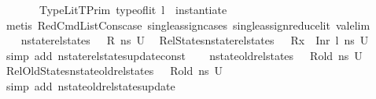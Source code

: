 \begin{isabellebody}
\ \ \ \ \ \ \ TypeLit{\isacharcolon}{\kern0pt}{\isachardoublequoteopen}TPrim\ {\isacharparenleft}{\kern0pt}type{\isacharunderscore}{\kern0pt}of{\isacharunderscore}{\kern0pt}lit\ l{\isacharparenright}{\kern0pt}\ {\isacharequal}{\kern0pt}\ instantiate\ {\isasymOmega}\ {\isasymtau}{\isachardoublequoteclose}\isanewline
\ \ \ \ \isamarkupfalse%
\ {\isacharparenleft}{\kern0pt}metis\ RedCmdListCons{\isacharunderscore}{\kern0pt}case\ single{\isacharunderscore}{\kern0pt}assign{\isacharunderscore}{\kern0pt}cases\ single{\isacharunderscore}{\kern0pt}assign{\isacharunderscore}{\kern0pt}reduce{\isacharunderscore}{\kern0pt}lit\ val{\isacharunderscore}{\kern0pt}elim{\isacharparenright}{\kern0pt}\isanewline
\ \ \ \ \isanewline
\ \ \isamarkupfalse%
\ {\isacartoucheopen}nstate{\isacharunderscore}{\kern0pt}rel{\isacharunderscore}{\kern0pt}states\ {\isasymLambda}\ {\isasymLambda}{\isacharprime}{\kern0pt}\ R\ ns\ U{}{\isacartoucheclose}\ \isamarkupfalse%
\ RelStates{\isacharcolon}{\kern0pt}{\isachardoublequoteopen}nstate{\isacharunderscore}{\kern0pt}rel{\isacharunderscore}{\kern0pt}states\ {\isasymLambda}\ {\isasymLambda}{\isacharprime}{\kern0pt}\ {\isacharparenleft}{\kern0pt}R{\isacharparenleft}{\kern0pt}x{}\ {\isasymmapsto}\ Inr\ l{\isacharparenright}{\kern0pt}{\isacharparenright}{\kern0pt}\ {\isacharquery}{\kern0pt}ns{\isacharprime}{\kern0pt}\ U{}{\isachardoublequoteclose}\ \isamarkupfalse%
\ {\isacharparenleft}{\kern0pt}simp\ add{\isacharcolon}{\kern0pt}\ nstate{\isacharunderscore}{\kern0pt}rel{\isacharunderscore}{\kern0pt}states{\isacharunderscore}{\kern0pt}update{\isacharunderscore}{\kern0pt}const{\isacharparenright}{\kern0pt}\isanewline
\ \ \isamarkupfalse%
\ {\isacartoucheopen}nstate{\isacharunderscore}{\kern0pt}old{\isacharunderscore}{\kern0pt}rel{\isacharunderscore}{\kern0pt}states\ {\isasymLambda}\ {\isasymLambda}{\isacharprime}{\kern0pt}\ R{\isacharunderscore}{\kern0pt}old\ ns\ U{}{\isacartoucheclose}\ \isamarkupfalse%
\ RelOldStates{\isacharcolon}{\kern0pt}{\isachardoublequoteopen}nstate{\isacharunderscore}{\kern0pt}old{\isacharunderscore}{\kern0pt}rel{\isacharunderscore}{\kern0pt}states\ {\isasymLambda}\ {\isasymLambda}{\isacharprime}{\kern0pt}\ R{\isacharunderscore}{\kern0pt}old\ {\isacharquery}{\kern0pt}ns{\isacharprime}{\kern0pt}\ U{}{\isachardoublequoteclose}\ \isamarkupfalse%
\ {\isacharparenleft}{\kern0pt}simp\ add{\isacharcolon}{\kern0pt}\ nstate{\isacharunderscore}{\kern0pt}old{\isacharunderscore}{\kern0pt}rel{\isacharunderscore}{\kern0pt}states{\isacharunderscore}{\kern0pt}update{\isacharparenright}{\kern0pt}\ \ \isanewline

\end{isabellebody}

